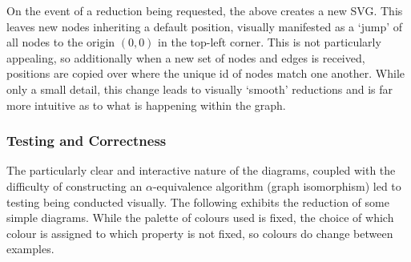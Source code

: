         On the event of a reduction being requested, the above creates a new SVG.
        This leaves new nodes inheriting a default position, visually manifested as a `jump' of all nodes to the origin $(0, 0)$ in the top-left corner.
        This is not particularly appealing, so additionally when a new set of nodes and edges is received, positions are copied over where the unique id of nodes match one another.
        While only a small detail, this change leads to visually `smooth' reductions and is far more intuitive as to what is happening within the graph.


    \subsubsection{Testing and Correctness}
        The particularly clear and interactive nature of the diagrams, coupled with the difficulty of constructing an $\alpha$-equivalence algorithm (graph isomorphism) led to testing being conducted visually.
        The following exhibits the reduction of some simple diagrams.
        While the palette of colours used is fixed, the choice of which colour is assigned to which property is not fixed, so colours do change between examples.

